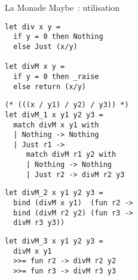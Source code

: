 \documentclass[10pt]{beamer}
\begin{document}
\begin{frame}[fragile]{La Monade Maybe~: utilisation}
  \begin{minipage}[c]{0.45\linewidth}
    \begin{verbatim}
let div x y =
  if y = 0 then Nothing
  else Just (x/y)

let divM x y =
  if y = 0 then _raise
  else return (x/y)
    \end{verbatim}
    \pause{}
    \begin{verbatim}
(* (((x / y1) / y2) / y3)) *)
let divM_1 x y1 y2 y3 =
  match divM x y1 with
  | Nothing -> Nothing
  | Just r1 ->
     match divM r1 y2 with
     | Nothing -> Nothing
     | Just r2 -> divM r2 y3
\end{verbatim}
  \end{minipage}
  \hfill
  \begin{minipage}[c]{0.45\linewidth}
    \pause{}
    \begin{verbatim}
let divM_2 x y1 y2 y3 =
  bind (divM x y1)  (fun r2 ->
  bind (divM r2 y2) (fun r3 ->
  divM r3 y3))
    \end{verbatim}
    \pause{}
    \begin{verbatim}
let divM_3 x y1 y2 y3 =
  divM x y1
  >>= fun r2 -> divM r2 y2
  >>= fun r3 -> divM r3 y3
    \end{verbatim}
  \end{minipage}
\end{frame}
\end{document}
